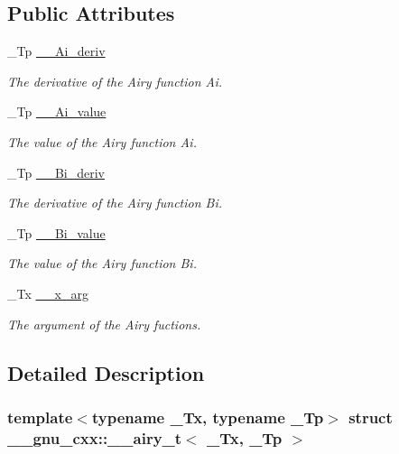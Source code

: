 \subsection*{Public Attributes}
\begin{DoxyCompactItemize}
\item 
\+\_\+\+Tp \hyperlink{struct____gnu__cxx_1_1____airy__t_a253c354c2733e787d5e793d462d1a4d3}{\+\_\+\+\_\+\+Ai\+\_\+deriv}
\begin{DoxyCompactList}\small\item\em The derivative of the Airy function Ai. \end{DoxyCompactList}\item 
\+\_\+\+Tp \hyperlink{struct____gnu__cxx_1_1____airy__t_a2a22c1c3bab509b44e7093c3691d9b13}{\+\_\+\+\_\+\+Ai\+\_\+value}
\begin{DoxyCompactList}\small\item\em The value of the Airy function Ai. \end{DoxyCompactList}\item 
\+\_\+\+Tp \hyperlink{struct____gnu__cxx_1_1____airy__t_ad37670f1ff4859ff7bddf6875dbaee92}{\+\_\+\+\_\+\+Bi\+\_\+deriv}
\begin{DoxyCompactList}\small\item\em The derivative of the Airy function Bi. \end{DoxyCompactList}\item 
\+\_\+\+Tp \hyperlink{struct____gnu__cxx_1_1____airy__t_ab23888416f25e10da70692684cb586ec}{\+\_\+\+\_\+\+Bi\+\_\+value}
\begin{DoxyCompactList}\small\item\em The value of the Airy function Bi. \end{DoxyCompactList}\item 
\+\_\+\+Tx \hyperlink{struct____gnu__cxx_1_1____airy__t_ad9cdd72baf6f12cd65fcb099350a727f}{\+\_\+\+\_\+x\+\_\+arg}
\begin{DoxyCompactList}\small\item\em The argument of the Airy fuctions. \end{DoxyCompactList}\end{DoxyCompactItemize}


\subsection{Detailed Description}
\subsubsection*{template$<$typename \+\_\+\+Tx, typename \+\_\+\+Tp$>$\newline
struct \+\_\+\+\_\+gnu\+\_\+cxx\+::\+\_\+\+\_\+airy\+\_\+t$<$ \+\_\+\+Tx, \+\_\+\+Tp $>$}



